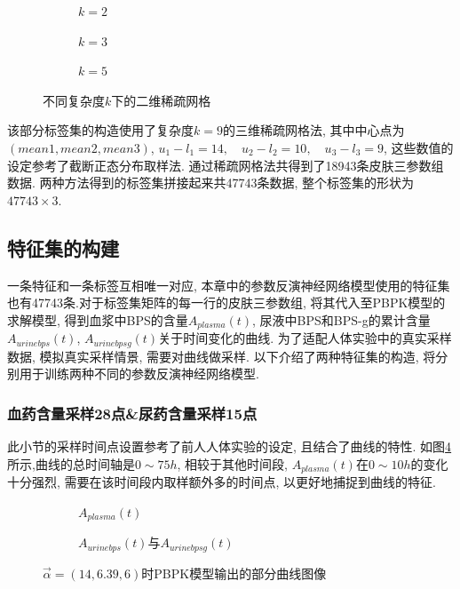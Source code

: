 \documentclass[a4paper,punct=banjiao,twoside]{ctexrep}
\theoremstyle{plain}
\theoremstyle{definition}
\theoremstyle{remark}
\begin{document}
\begin{figure}[H]
  \centering
  \begin{subfigure}{0.32\textwidth}
    \centering
    \resizebox{1\textwidth}{!}{}
    \caption{$k=2$}
  \end{subfigure}
  \begin{subfigure}{0.32\textwidth}
    \centering
    \resizebox{1\textwidth}{!}{}
    \caption{$k=3$}
  \end{subfigure}
  \begin{subfigure}{0.32\textwidth}
    \centering
    \resizebox{1\textwidth}{!}{}
    \caption{$k=5$}
  \end{subfigure}

  \caption{不同复杂度$k$下的二维稀疏网格}
  \label{稀疏网格}
\end{figure}

该部分标签集的构造使用了复杂度$k=9$的三维稀疏网格法, 其中中心点为$(mean1,mean2,mean3)$, $u_1-l_1 = 14,\quad u_2-l_2 = 10,\quad u_3-l_3 = 9$, 这些数值的设定参考了截断正态分布取样法.
通过稀疏网格法共得到了18943条皮肤三参数组数据. 两种方法得到的标签集拼接起来共47743条数据, 整个标签集的形状为$47743\times 3$.

\subsection{特征集的构建}
\label{3.2.2}
一条特征和一条标签互相唯一对应, 本章中的参数反演神经网络模型使用的特征集也有47743条.对于标签集矩阵的每一行的皮肤三参数组, 将其代入至PBPK模型的求解模型, 得到血浆中BPS的含量$A_{plasma}(t)$, 尿液中BPS和BPS-g的累计含量$A_{urinebps}(t)$, $A_{urinebpsg}(t)$关于时间变化的曲线.
为了适配人体实验中的真实采样数据, 模拟真实采样情景, 需要对曲线做采样. 以下介绍了两种特征集的构造, 将分别用于训练两种不同的参数反演神经网络模型.

\subsubsection*{血药含量采样28点\&尿药含量采样15点}
此小节的采样时间点设置参考了前人人体实验的设定\cite{11,13}, 且结合了曲线的特性.
如图\ref{曲线}所示,曲线的总时间轴是$0\sim 75h$, 相较于其他时间段, $A_{plasma}(t)$在$0\sim 10h$的变化十分强烈, 需要在该时间段内取样额外多的时间点, 以更好地捕捉到曲线的特征.



\begin{figure}[H]
  \centering
  \begin{subfigure}{0.45\textwidth}
    \centering
    \resizebox{1\textwidth}{!}{}
    \caption{$A_{plasma}(t)$}
    \label{曲线a}
  \end{subfigure}
  \begin{subfigure}{0.45\textwidth}
    \centering
    \resizebox{1\textwidth}{!}{}
    \caption{$A_{urinebps}(t)$与$A_{urinebpsg}(t)$}
    \label{曲线b}
  \end{subfigure}


  \caption{$\vec{\alpha}=(14,6.39,6)$时PBPK模型输出的部分曲线图像}
  \label{曲线}
\end{figure}
\end{document}
